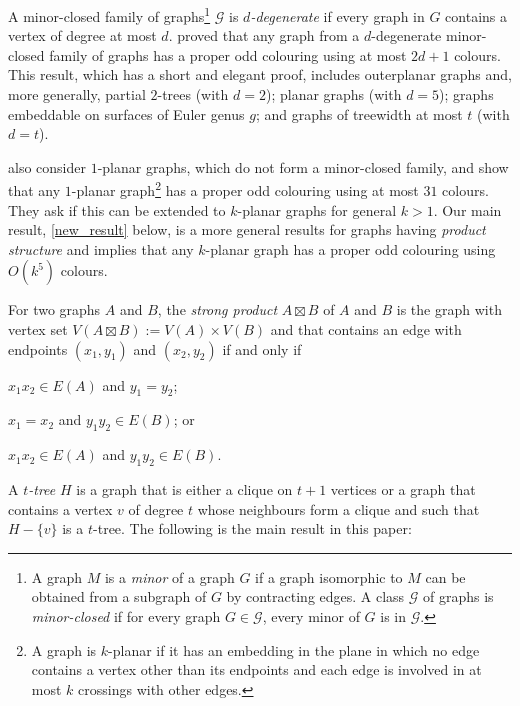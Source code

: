 \documentclass{patmorin}
\begin{document}
A minor-closed family of graphs\footnote{A graph $M$ is a \textit{minor} of a graph $G$ if a graph isomorphic to $M$ can be obtained from a subgraph of $G$ by contracting edges. A class $\mathcal{G}$ of graphs is \emph{minor-closed} if for every graph $G\in\mathcal{G}$, every minor of $G$ is in $\mathcal{G}$.} $\mathcal{G}$ is \emph{$d$-degenerate} if every graph in $G$ contains a vertex of degree at most $d$.
\citet{cranston.lafferty.ea:note} proved that any graph from a $d$-degenerate minor-closed family of graphs has a proper odd colouring using at most $2d+1$ colours.  This result, which has a short and elegant proof, includes outerplanar graphs and, more generally, partial $2$-trees (with $d=2$); planar graphs (with $d=5$); graphs embeddable on surfaces of Euler genus $g$; and graphs of treewidth at most $t$ (with $d=t$).

\citet{cranston.lafferty.ea:note} also consider $1$-planar graphs, which do not form a minor-closed family, and show that any $1$-planar graph\footnote{A graph is $k$-planar if it has an embedding in the plane in which no edge contains a vertex other than its endpoints and each edge is involved in at most $k$ crossings with other edges.} has a proper odd colouring using at most $31$ colours.  They ask if this can be extended to $k$-planar graphs for general $k>1$.  Our main result, \cref{new_result} below, is a more general results for graphs having \emph{product structure} and implies that any $k$-planar graph has a proper odd colouring using $O(k^5)$ colours.
%

For two graphs $A$ and $B$, the \emph{strong product} $A\boxtimes B$ of $A$ and $B$ is the graph with vertex set $V(A\boxtimes B):=V(A)\times V(B)$ and that contains an edge with endpoints $(x_1,y_1)$ and $(x_2,y_2)$ if and only if
\begin{inparaenum}[(i)]
  \item $x_1x_2\in E(A)$ and $y_1=y_2$;
  \item $x_1=x_2$ and $y_1y_2\in E(B)$; or
  \item $x_1x_2\in E(A)$ and $y_1y_2\in E(B)$.
\end{inparaenum}
A \emph{$t$-tree} $H$ is a graph that is either a clique on $t+1$ vertices or a graph that contains a vertex $v$ of degree $t$ whose neighbours form a clique and such that $H-\{v\}$ is a $t$-tree.  The following is the main result in this paper:
\end{document}
